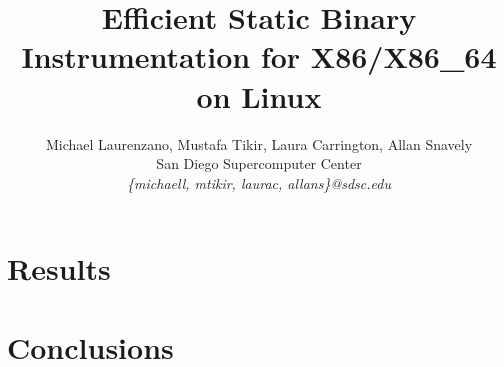 \documentclass[a4paper,11pt,leqno,notitlepage,onecolumn]{article}
\begin{document}
\title{Efficient Static Binary Instrumentation for X86/X86\_64 on Linux}
\author{Michael Laurenzano, Mustafa Tikir, Laura Carrington, Allan Snavely\\
San Diego Supercomputer Center\\
\it{\{michaell, mtikir, laurac, allans\}@sdsc.edu}}
\date{}
\maketitle

\begin{abstract}

\end{abstract}

\label{Section:Introduction}


\label{Section:Overview}


\label{Section:Challenges}


\label{Section:Results}
\section{Results}
%

\label{Section:Future}


\label{Section:Conclusions}
\section{Conclusions}
%



\end{document}
